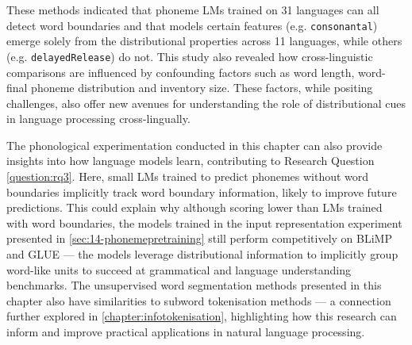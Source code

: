 These methods indicated that phoneme LMs trained on 31 languages can all detect word boundaries and that models certain features (e.g. \texttt{consonantal}) emerge solely from the distributional properties across 11 languages, while others (e.g. \texttt{delayedRelease}) do not. This study also revealed how cross-linguistic comparisons are influenced by confounding factors such as word length, word-final phoneme distribution and inventory size. These factors, while positing challenges, also offer new avenues for understanding the role of distributional cues in language processing cross-lingually.

The phonological experimentation conducted in this chapter can also provide insights into how language models learn, contributing to Research Question \ref{question:rq3}. Here, small LMs trained to predict phonemes without word boundaries implicitly track word boundary information, likely to improve future predictions. This could explain why although scoring lower than LMs trained with word boundaries, the models trained in the input representation experiment presented in \cref{sec:14-phonemepretraining} still perform competitively on BLiMP and GLUE --- the models leverage distributional information to implicitly group word-like units to succeed at grammatical and language understanding benchmarks. The unsupervised word segmentation methods presented in this chapter also have similarities to subword tokenisation methods --- a connection further explored in \cref{chapter:infotokenisation}, highlighting how this research can inform and improve practical applications in natural language processing.





